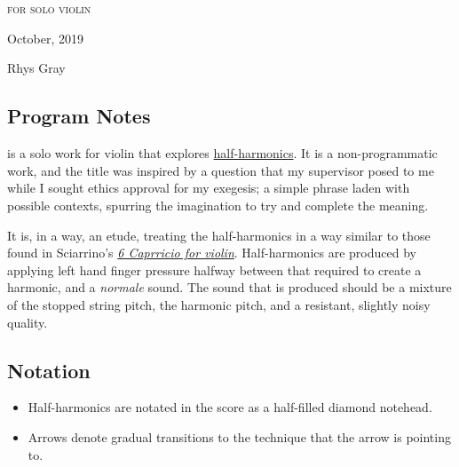 \newpage

\chapter[\violinPiece]{}


\vspace*{3cm}
\begin{center}
\textsc{for solo violin}
\vspace*{3.5cm}

\HRule{0.5pt}


\LARGE \textbf{\uppercase{\violinPiece}}
\HRule{2pt}

\vspace{1.3cm}

\normalsize October, 2019
\date{}

\vspace*{5\baselineskip}

Rhys Gray

\end{center}
\newpage
\section*{Program Notes}
\violinPiece\space is a solo work for violin that explores \hyperref[sec:half-harmonics]{half-harmonics}.
It is a non-programmatic work, and the title was inspired by a question that my supervisor posed to me while I sought ethics approval for my exegesis; a simple phrase laden with possible contexts, spurring the imagination to try and complete the meaning.

It is, in a way, an etude, treating the half-harmonics in a way similar to those found in Sciarrino's \hyperref[fig:sciarrinoExcerpt]{\emph{6 Caprricio for violin}}. 
Half-harmonics are produced by applying left hand finger pressure halfway between that required to create a harmonic, and a \emph{normale} sound. 
The sound that is produced should be a mixture of the stopped string pitch, the harmonic pitch, and a resistant, slightly noisy quality.

\section*{Notation}
\begin{itemize}

    \item Half-harmonics are notated in the score as a half-filled diamond notehead.
    \item Arrows denote gradual transitions to the technique that the arrow is pointing to.
\end{itemize}

\newpage\label{app:violinPiece Score}
